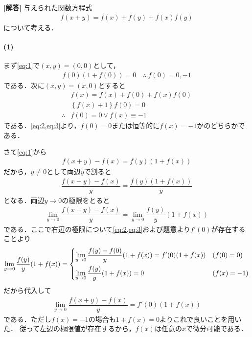 \documentclass[../../main.tex]{subfiles}
\begin{document}
\begin{oframed}
  
\end{oframed}

{\bf [解答]}
与えられた関数方程式
\begin{align}
  f(x+y)=f(x)+f(y)+f(x)f(y) \label{eq:1}
\end{align}
について考える．

\paragraph{(1)}

まず\cref{eq:1}で$(x,y)=(0,0)$として，
\begin{align}
  f(0)(1+f(0))=0 \quad\therefore\ f(0)=0,-1 \label{eq:2}
\end{align}
である．次に$(x,y)=(x,0)$とすると
\begin{align}
  & f(x) = f(x)+f(0)+f(x)f(0) \\
  & \left\{f(x)+1\right\}f(0) = 0 \\
  \therefore
  & f(0) = 0 \lor f(x) \equiv -1 \label{eq:3}
\end{align}
である．\cref{eq:2,eq:3}より，$f(0)=0$または恒等的に$f(x)=-1$かのどちらかである．

さて\cref{eq:1}から
\begin{align}
  f(x+y)-f(x) = f(y)\left(1+f(x)\right)
\end{align}
だから，$y \neq 0$として両辺$y$で割ると
\begin{align}
  \dfrac{f(x+y)-f(x)}{y}=\dfrac{f(y)(1+f(x))}{y}
\end{align}
となる．両辺$y\to 0$の極限をとると
\begin{align}
  \lim_{y\to 0} \dfrac{f(x+y)-f(x)}{y} = \lim_{y\to 0}\dfrac{f(y)}{y}(1+f(x))
\end{align}
である．ここで右辺の極限について\cref{eq:2,eq:3}および題意より$f'(0)$が存在することより
\begin{align}
  \lim_{y\to 0}\dfrac{f(y)}{y}(1+f(x)) =
  \begin{dcases}
    \lim_{y\to 0}\dfrac{f(y)-f(0)}{y}(1+f(x)) =  f'(0)(1+f(x)) & (f(0)=0) \\
    \lim_{y\to 0}\dfrac{f(y)}{y}(1+f(x)) = 0 & (f(x)=-1)
  \end{dcases}
\end{align}
だから代入して
\begin{align}
  \lim_{y\to 0} \dfrac{f(x+y)-f(x)}{y} = f'(0)(1+f(x)) \label{eq:4}
\end{align}
である．ただし$f(x)=-1$の場合も$1+f(x)=0$よりこれで良いことを用いた．
従って左辺の極限値が存在するから，$f(x)$は任意の$x$で微分可能である．
\end{document}
